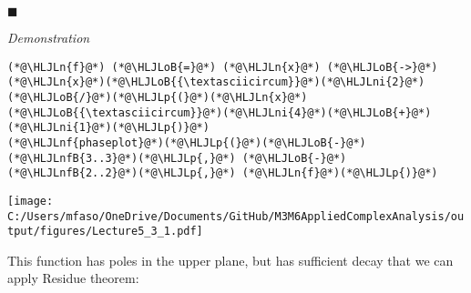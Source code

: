 \documentclass[12pt,a4paper]{article}
\newcommand{\HLJLn}[1]{#1}
\newcommand{\HLJLnf}[1]{\textcolor[RGB]{66,102,213}{#1}}
\newcommand{\HLJLnfB}[1]{\textcolor[RGB]{59,151,46}{#1}}
\newcommand{\HLJLni}[1]{\textcolor[RGB]{59,151,46}{#1}}
\newcommand{\HLJLoB}[1]{\textcolor[RGB]{102,102,102}{\textbf{#1}}}
\newcommand{\HLJLp}[1]{#1}
\begin{document}
\ensuremath{\blacksquare}

\emph{Demonstration}


\begin{lstlisting}
(*@\HLJLn{f}@*) (*@\HLJLoB{=}@*) (*@\HLJLn{x}@*) (*@\HLJLoB{->}@*) (*@\HLJLn{x}@*)(*@\HLJLoB{{\textasciicircum}}@*)(*@\HLJLni{2}@*)(*@\HLJLoB{/}@*)(*@\HLJLp{(}@*)(*@\HLJLn{x}@*)(*@\HLJLoB{{\textasciicircum}}@*)(*@\HLJLni{4}@*)(*@\HLJLoB{+}@*)(*@\HLJLni{1}@*)(*@\HLJLp{)}@*)
(*@\HLJLnf{phaseplot}@*)(*@\HLJLp{(}@*)(*@\HLJLoB{-}@*)(*@\HLJLnfB{3..3}@*)(*@\HLJLp{,}@*) (*@\HLJLoB{-}@*)(*@\HLJLnfB{2..2}@*)(*@\HLJLp{,}@*) (*@\HLJLn{f}@*)(*@\HLJLp{)}@*)
\end{lstlisting}

\texttt{[image: C:/Users/mfaso/OneDrive/Documents/GitHub/M3M6AppliedComplexAnalysis/output/figures/Lecture5\_3\_1.pdf]}

This function has poles in the upper plane, but has sufficient decay that we can apply Residue theorem:
\end{document}
